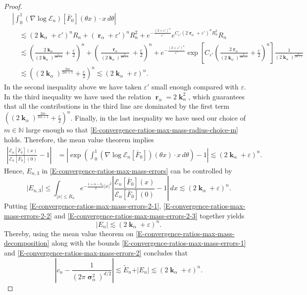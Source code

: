 \documentclass[reqno]{amsart}
\DeclareMathOperator{\bsigma}{\boldsymbol{\sigma}}
\DeclareMathOperator{\bk}{\boldsymbol{k}}
\DeclareMathOperator{\br}{\boldsymbol{r}}
\numberwithin{equation}{section}
\begin{document}
{\begin{proof}
\begin{align*}
&\left\vert\int_0^1(\nabla\log\mathcal{E}_n)[\bar F_0](\theta x)\cdot x\,d\theta\right\vert\\
&\quad \lesssim (2\bk_\alpha+\varepsilon')^n R_n+(\br_\alpha+\varepsilon')^n R_n^2+e^{-\frac{(2+\varepsilon')^n}{\varepsilon'}}e^{C_{\varepsilon'}(2\br_\alpha+\varepsilon')^nR_n^2}R_n\\
&\quad \lesssim \left(\frac{2\bk_\alpha}{(2\bk_\alpha)^{\frac{1}{2m+1}}}+\frac{\varepsilon}{2}\right)^n+\left(\frac{\br_\alpha}{(2\bk_\alpha)^{\frac{2}{2m+1}}}+\frac{\varepsilon}{2}\right)^n+e^{-\frac{(2+\varepsilon')^n}{\varepsilon'}}\exp\left[C_{\varepsilon'}\left(\frac{2\br_\alpha}{(2\bk_\alpha)^{\frac{2}{2m+1}}}+\frac{\varepsilon}{2}\right)^n\right]\frac{1}{(2\bk_\alpha)^{\frac{n}{2m+1}}}\\
&\quad \lesssim \left((2\bk_\alpha)^{\frac{2m}{2m+1}}+\frac{\varepsilon}{2}\right)^n\lesssim \left(2\bk_\alpha+\varepsilon\right)^n.
\end{align*}
In the second inequality above we have taken $\varepsilon'$ small enough compared with $\varepsilon$. In the third inequality we have used the relation $\br_\alpha=2\bk_\alpha^2$, which guarantees that all the contributions in the third line are dominated by the first term $((2\bk_\alpha)^{\frac{2m}{2m+1}}+\frac{\varepsilon}{2})^n$. Finally, in the last inequality we have used our choice of $m\in \mathbb{N}$ large enough so that \eqref{E-convergence-ratios-max-mass-radius-choice-m} holds. Therefore, the mean value theorem implies
\begin{align*}
\left\vert\frac{\mathcal{E}_n[\bar F_0](x)}{\mathcal{E}_n[\bar F_0](0)}-1\right\vert&=\left\vert\exp\left(\int_0^1(\nabla\log\mathcal{E}_n[\bar F_0])(\theta x)\cdot x\,d\theta\right)-1\right\vert\lesssim (2\bk_\alpha+\varepsilon)^n.
\end{align*}
Hence, $E_{n,3}$ in \eqref{E-convergence-ratios-max-mass-errors} can be controlled by
\begin{equation}\label{E-convergence-ratios-max-mass-errors-2-3}
\vert E_{n,3}\vert\leq \int_{\vert x\vert\leq R_n}e^{-\frac{1+\alpha-k_n}{2}\vert x\vert^2}\left\vert\frac{\mathcal{E}_n[\bar F_0](x)}{\mathcal{E}_n[\bar F_0](0)}-1\right\vert\,dx\lesssim (2\bk_\alpha+\varepsilon)^n.
\end{equation}
Putting \eqref{E-convergence-ratios-max-mass-errors-2-1}, \eqref{E-convergence-ratios-max-mass-errors-2-2} and \eqref{E-convergence-ratios-max-mass-errors-2-3} together yields
\begin{equation}\label{E-convergence-ratios-max-mass-errors-2}
\vert E_n\vert \lesssim (2\bk_\alpha+\varepsilon)^n.
\end{equation}
Thereby, using the mean value theorem on \eqref{E-convergence-ratios-max-mass-decomposition} along with the bounds \eqref{E-convergence-ratios-max-mass-errors-1} and \eqref{E-convergence-ratios-max-mass-errors-2} concludes that
$$\left\vert c_n-\frac{1}{(2\pi\bsigma_\alpha^2)^{d/2}}\right\vert \lesssim \tilde{E}_n+\vert E_n\vert\lesssim (2\bk_\alpha+\varepsilon)^n.$$
\end{proof}

}
\end{document}
